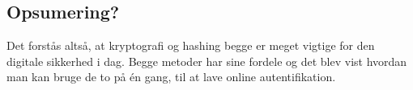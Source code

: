 \subsection{Opsumering?}
Det forstås altså, at kryptografi og hashing begge er meget vigtige for den digitale sikkerhed i dag.
Begge metoder har sine fordele og det blev vist hvordan man kan bruge de to på én gang, til at lave online autentifikation.
